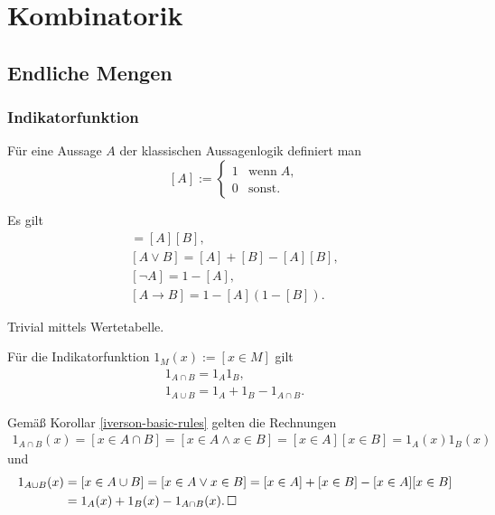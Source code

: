 
\chapter{Kombinatorik}

\section{Endliche Mengen}

\subsection{Indikatorfunktion}

\begin{Definition}\newlinefirst
Für eine Aussage $A$ der klassischen Aussagenlogik definiert man
\[[A] := \begin{cases}
1 &\text{wenn}\;A,\\
0 &\text{sonst}.
\end{cases}\]
\end{Definition}

\begin{Korollar}\label{iverson-basic-rules}
Es gilt
\begin{gather*}
[A\land B] = [A][B],\\
[A\lor B] = [A]+[B]-[A][B],\\
[\neg A] = 1-[A],\\
[A\to B] = 1-[A](1-[B]).
\end{gather*}
\end{Korollar}
\begin{Beweis} Trivial mittels Wertetabelle.\,\qedsymbol
\end{Beweis}

\begin{Korollar}\label{indicator-set-op}
Für die Indikatorfunktion $1_M(x):=[x\in M]$ gilt
\begin{gather*}
1_{A\cap B} = 1_A 1_B,\\
1_{A\cup B} = 1_A + 1_B - 1_{A\cap B}.
\end{gather*}
\end{Korollar}
\begin{Beweis}
Gemäß Korollar \ref{iverson-basic-rules} gelten die
Rechnungen
\begin{align*}
1_{A\cap B}(x) = [x\in A\cap B]
= [x\in A\land x\in B] = [x\in A][x\in B] = 1_A(x)1_B(x)
\end{align*}
und
\begin{align*}
1_{A\cup B}(x) &= [x\in A\cup B] = [x\in A\lor x\in B]
= [x\in A] + [x\in B] - [x\in A][x\in B]\\
&= 1_A(x) + 1_B(x) - 1_{A\cap B}(x).\,\square
\end{align*}
\end{Beweis}

